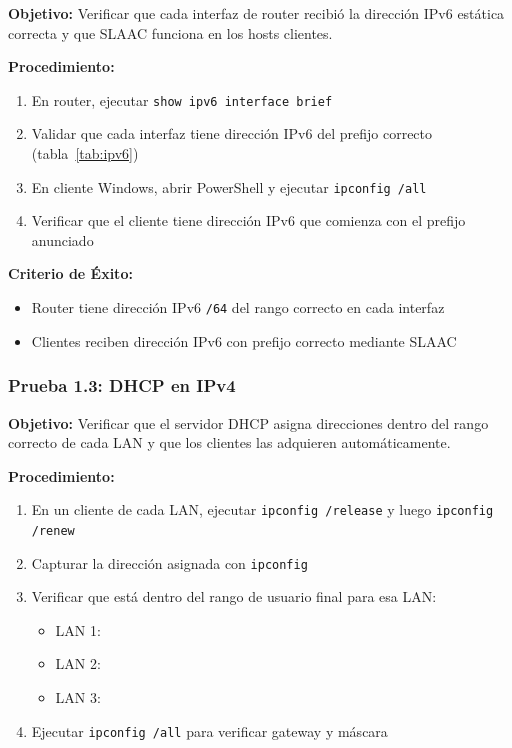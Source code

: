 \textbf{Objetivo:} Verificar que cada interfaz de router recibió la dirección IPv6
estática correcta y que SLAAC funciona en los hosts clientes.

\textbf{Procedimiento:}
\begin{enumerate}
\item En router, ejecutar \texttt{show ipv6 interface brief}
\item Validar que cada interfaz tiene dirección IPv6 del prefijo correcto (tabla~\ref{tab:ipv6})
\item En cliente Windows, abrir PowerShell y ejecutar \texttt{ipconfig /all}
\item Verificar que el cliente tiene dirección IPv6 que comienza con el prefijo anunciado
\end{enumerate}

\textbf{Criterio de Éxito:}
\begin{itemize}
\item Router tiene dirección IPv6 \texttt{/64} del rango correcto en cada interfaz
\item Clientes reciben dirección IPv6 con prefijo correcto mediante SLAAC
\end{itemize}


\subsubsection{Prueba 1.3: DHCP en IPv4}

\textbf{Objetivo:} Verificar que el servidor DHCP asigna direcciones dentro del rango
correcto de cada LAN y que los clientes las adquieren automáticamente.

\textbf{Procedimiento:}
\begin{enumerate}
\item En un cliente de cada LAN, ejecutar \texttt{ipconfig /release} y luego \texttt{ipconfig /renew}
\item Capturar la dirección asignada con \texttt{ipconfig}
\item Verificar que está dentro del rango de usuario final para esa LAN:
  \begin{itemize}
  \item LAN 1: \ipRangoLanUno
  \item LAN 2: \ipRangoLanDos
  \item LAN 3: \ipRangoLanTres
  \end{itemize}
\item Ejecutar \texttt{ipconfig /all} para verificar gateway y máscara
\end{enumerate}

